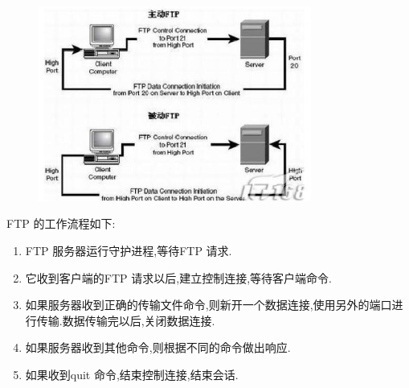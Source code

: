 \begin{figure}[H]
  \centering
  \includegraphics[width=0.8\textwidth]{res/ftp3.png}
\end{figure}


FTP 的工作流程如下:
\begin{enumerate}[(1)]
    \item FTP 服务器运行守护进程,等待FTP 请求.
    \item 它收到客户端的FTP 请求以后,建立控制连接,等待客户端命令.
    \item 如果服务器收到正确的传输文件命令,则新开一个数据连接,使用另外的端口进行传输.数据传输完以后,关闭数据连接.
    \item 如果服务器收到其他命令,则根据不同的命令做出响应.
    \item 如果收到quit 命令,结束控制连接,结束会话.
\end{enumerate}
